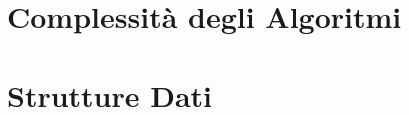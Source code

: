 



\begin{titlepage}
    \maketitle
\end{titlepage}

\section*{Complessità degli Algoritmi}


\section*{Strutture Dati}


% 


